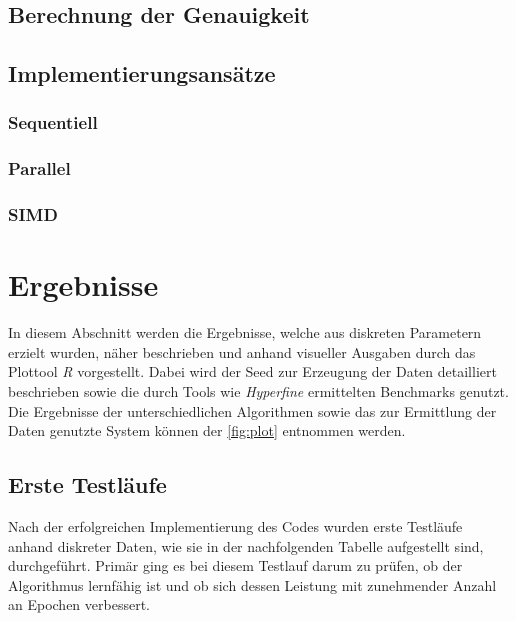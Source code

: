 \documentclass[a4paper, 12pt]{article}
\begin{document}
\subsection{Berechnung der Genauigkeit}

\subsection{Implementierungsansätze} 
\subsubsection{Sequentiell} 
\subsubsection{Parallel} 
\subsubsection{SIMD}

\newpage %

\section{Ergebnisse}\label{chapter..4}

In diesem Abschnitt werden die Ergebnisse, welche aus diskreten Parametern erzielt wurden, näher 
beschrieben und anhand visueller Ausgaben durch das Plottool \textit{R} vorgestellt. Dabei wird der 
Seed zur Erzeugung der Daten detailliert beschrieben sowie die durch Tools wie \textit{Hyperfine} 
ermittelten Benchmarks genutzt. Die Ergebnisse der unterschiedlichen Algorithmen sowie das zur 
Ermittlung der Daten genutzte System können der \autoref{fig:plot} entnommen werden.

\subsection{Erste Testläufe}\label{chapter..4.1}

Nach der erfolgreichen Implementierung des Codes wurden erste Testläufe anhand diskreter Daten, wie 
sie in der nachfolgenden Tabelle aufgestellt sind, durchgeführt. Primär ging es bei diesem Testlauf 
darum zu prüfen, ob der Algorithmus lernfähig ist und ob sich dessen Leistung mit zunehmender Anzahl 
an Epochen verbessert.
\end{document}

